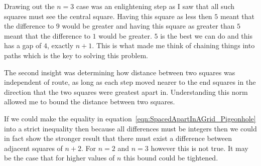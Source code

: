 Drawing out the $n = 3$ case was an enlightening step as I saw that all such squares must see the central square. Having this square as less then $5$ meant that the difference to $9$ would be greater and having this square as greater than $5$ meant that the difference to $1$ would be greater. $5$ is the best we can do and this has a gap of $4$, exactly $n + 1$. This is what made me think of chaining things into paths which is the key to solving this problem.

The second insight was determining how distance between two squares was independent of route, as long as each step moved nearer to the end squares in the direction that the two squares were greatest apart in. Understanding this norm allowed me to bound the distance between two squares.

If we could make the equality in equation~\ref{eqn:SpacedApartInAGrid_Pigeonhole} into a strict inequality then because all differences must be integers then we could in fact show the stronger result that there must exist a difference between adjacent squares of $n + 2$. For $n = 2$ and $n = 3$ however this is not true. It may be the case that for higher values of $n$ this bound could be tightened.